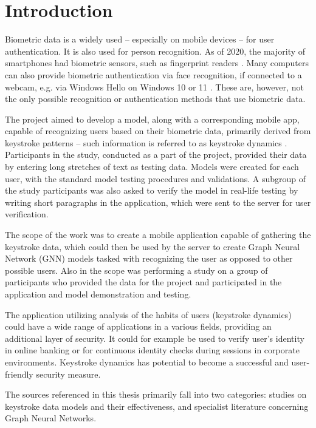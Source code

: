 
\chapter{Introduction}

Biometric data is a widely used -- especially on mobile devices -- for user authentication. It is also used for person recognition. As of 2020, the majority of smartphones had biometric sensors, such as fingerprint readers \cite{statista_biometric_phones_2025}. Many computers can also provide biometric authentication via face recognition, if connected to a webcam, e.g. via Windows Hello on Windows 10 or 11 \cite{microsoft_windows_hello_2025}. These are, however, not the only possible recognition or authentication methods that use biometric data.

The project aimed to develop a model, along with a corresponding mobile app, capable of recognizing users based on their biometric data, primarily derived from keystroke patterns -- such information is referred to as keystroke dynamics \cite{wikipedia_keystrokes_2025}. Participants in the study, conducted as a part of the project, provided their data by entering long stretches of text as testing data. Models were created for each user, with the standard model testing procedures and validations. A subgroup of the study participants was also asked to verify the model in real-life testing by writing short paragraphs in the application, which were sent to the server for user verification.

The scope of the work was to create a mobile application capable of gathering the keystroke data, which could then be used by the server to create Graph Neural Network (GNN) models tasked with recognizing the user as opposed to other possible users. Also in the scope was performing a study on a group of participants who provided the data for the project and participated in the application and model demonstration and testing.

The application utilizing analysis of the habits of users (keystroke dynamics) could have a wide range of applications in a various fields, providing an additional layer of security. It could for example be used to verify user's identity in online banking or for continuous identity checks during sessions in corporate environments. Keystroke dynamics has potential to become a successful and user-friendly security measure.

The sources referenced in this thesis primarily fall into two categories: studies on keystroke data models and their effectiveness, and specialist literature concerning Graph Neural Networks.

